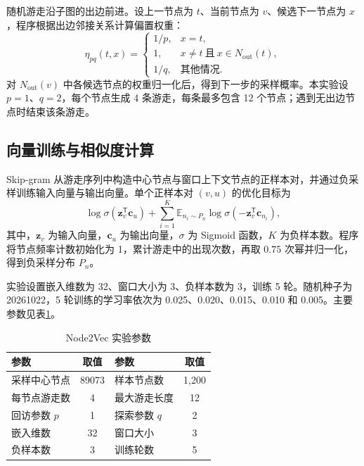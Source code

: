 \documentclass[UTF8,a4paper,12pt,fontset=windows]{ctexart}
\begin{document}
随机游走沿子图的出边前进。设上一节点为 $t$、当前节点为 $v$、候选下一节点为 $x$，程序根据出边邻接关系计算偏置权重：
\begin{equation}
\eta_{pq}(t,x)=
\begin{cases}
1/p, & x=t,\\
1, & x\ne t\ \text{且}\ x\in N_{\mathrm{out}}(t),\\
1/q, & \text{其他情况}.
\end{cases}
\end{equation}
对 $N_{\mathrm{out}}(v)$ 中各候选节点的权重归一化后，得到下一步的采样概率。本实验设 $p=1$、$q=2$，每个节点生成 4 条游走，每条最多包含 12 个节点；遇到无出边节点时结束该条游走。

\subsection{向量训练与相似度计算}
Skip-gram 从游走序列中构造中心节点与窗口上下文节点的正样本对，并通过负采样训练输入向量与输出向量。单个正样本对 $(v,u)$ 的优化目标为
\begin{equation}
\log\sigma(\mathbf{z}_v^{\mathsf T}\mathbf{c}_u)+\sum_{i=1}^{K}\mathbb{E}_{n_i\sim P_n}\log\sigma(-\mathbf{z}_v^{\mathsf T}\mathbf{c}_{n_i}),
\end{equation}
其中，$\mathbf{z}_v$ 为输入向量，$\mathbf{c}_u$ 为输出向量，$\sigma$ 为 Sigmoid 函数，$K$ 为负样本数。程序将节点频率计数初始化为 1，累计游走中的出现次数，再取 $0.75$ 次幂并归一化，得到负采样分布 $P_n$。

实验设置嵌入维数为 32、窗口大小为 3、负样本数为 3，训练 5 轮。随机种子为 20261022，5 轮训练的学习率依次为 0.025、0.020、0.015、0.010 和 0.005。主要参数见表\ref{tab:param}。

\begin{table}[H]
\centering
\caption{Node2Vec 实验参数}\label{tab:param}
\begin{tabular}{lclc}
\toprule
参数 & 取值 & 参数 & 取值\\
\midrule
采样中心节点 & 89073 & 样本节点数 & 1,200\\
每节点游走数 & 4 & 最大游走长度 & 12\\
回访参数 $p$ & 1 & 探索参数 $q$ & 2\\
嵌入维数 & 32 & 窗口大小 & 3\\
负样本数 & 3 & 训练轮数 & 5\\
\bottomrule
\end{tabular}
\end{table}
\end{document}

